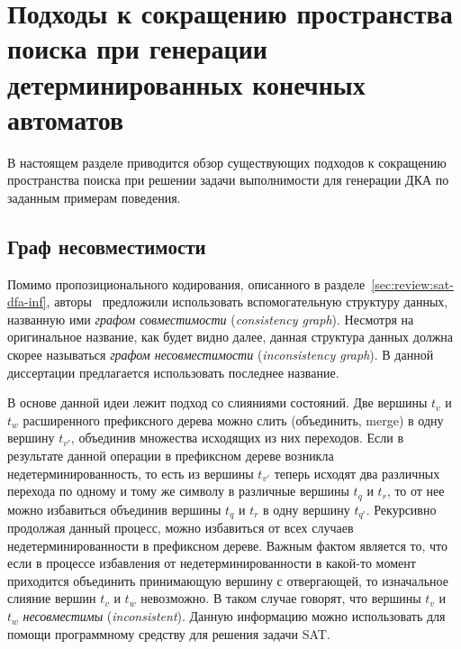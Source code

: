 
\section{Подходы к сокращению пространства поиска при генерации детерминированных конечных автоматов}
\label{sec:review:sym-breaking}

В настоящем разделе приводится обзор существующих подходов к сокращению пространства поиска при решении задачи выполнимости для генерации ДКА по заданным примерам поведения. 


\subsection{Граф несовместимости}
\label{sec:review:sym-breaking:ig}

Помимо пропозиционального кодирования, описанного в разделе~\ref{sec:review:sat-dfa-inf}, авторы~\cite{heule-icgi10} предложили использовать вспомогательную структуру данных, названную ими \emph{графом совместимости} (\emph{consistency graph}).
Несмотря на оригинальное название, как будет видно далее, данная структура данных должна скорее называться \emph{графом несовместимости} (\emph{inconsistency graph}).
В данной диссертации предлагается использовать последнее название.

В основе данной идеи лежит подход со слияниями состояний.
Две вершины $t_{v}$ и $t_{w}$ расширенного префиксного дерева можно слить (объединить, merge) в одну вершину $t_{v'}$, объединив множества исходящих из них переходов.
Если в результате данной операции в префиксном дереве возникла недетерминированность, то есть из вершины $t_{v'}$ теперь исходят два различных перехода по одному и тому же символу в различные вершины $t_{q}$ и $t_{r}$, то от нее можно избавиться объединив вершины $t_{q}$ и $t_{r}$ в одну вершину $t_{q'}$. 
Рекурсивно продолжая данный процесс, можно избавиться от всех случаев недетерминированности в префиксном дереве.
Важным фактом является то, что если в процессе избавления от недетерминированности в какой-то момент приходится объединить принимающую вершину с отвергающей, то изначальное слияние вершин $t_{v}$ и $t_{w}$ невозможно.
В таком случае говорят, что вершины $t_{v}$ и $t_{w}$ \emph{несовместимы} (\emph{inconsistent}).
Данную информацию можно использовать для помощи программному средству для решения задачи SAT.

